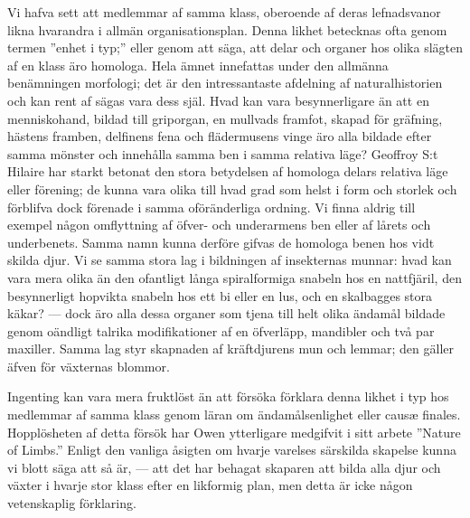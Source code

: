 Vi hafva sett att medlemmar af samma klass, oberoende af deras lefnadsvanor likna hvarandra i allmän organisationsplan. Denna likhet betecknas ofta genom termen ”enhet i typ;” eller genom att säga, att delar och organer hos olika slägten af en klass äro homologa. Hela ämnet innefattas under den allmänna benämningen morfologi; det är den intressantaste afdelning af naturalhistorien och kan rent af sägas vara dess själ. Hvad kan vara besynnerligare än att en menniskohand, bildad till griporgan, en mullvads framfot, skapad för gräfning, hästens framben, delfinens fena och flädermusens vinge äro alla bildade efter samma mönster och innehålla samma ben i samma relativa läge? Geoffroy S:t Hilaire har starkt betonat den stora betydelsen af homologa delars relativa läge eller förening; de kunna vara olika till hvad grad som helst i form och storlek och förblifva dock förenade i samma oföränderliga ordning. Vi finna aldrig till exempel någon omflyttning af öfver- och underarmens ben eller af lårets och underbenets. Samma namn kunna derföre gifvas de homologa benen hos vidt skilda djur. Vi se samma stora lag i bildningen af insekternas munnar: hvad kan vara mera olika än den ofantligt långa spiralformiga snabeln hos en nattfjäril, den besynnerligt hopvikta snabeln hos ett bi eller en lus, och en skalbagges stora käkar? — dock äro alla dessa organer som tjena till helt olika ändamål bildade genom oändligt talrika modifikationer af en öfverläpp, mandibler och två par maxiller. Samma lag styr skapnaden af kräftdjurens mun och lemmar; den gäller äfven för växternas blommor.

Ingenting kan vara mera fruktlöst än att försöka förklara denna likhet i typ hos medlemmar af samma klass genom läran om ändamålsenlighet eller causæ finales. Hopplösheten af detta försök har Owen ytterligare medgifvit i sitt arbete ”Nature of Limbs.” Enligt den vanliga åsigten om hvarje varelses särskilda skapelse kunna vi blott säga att så är, — att det har behagat skaparen att bilda alla djur och växter i hvarje stor klass efter en likformig plan, men detta är icke någon vetenskaplig förklaring.

